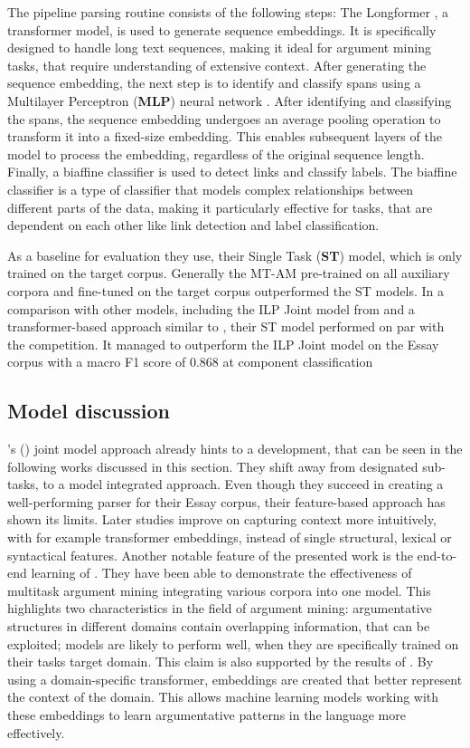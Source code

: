The pipeline parsing routine consists of the following steps: The Longformer \parencite{beltagy2020longformer}, a transformer model, is used to generate sequence embeddings. It is specifically designed to handle long text sequences, making it ideal for argument mining tasks, that require understanding of extensive context. After generating the sequence embedding, the next step is to identify and classify spans using a Multilayer Perceptron (\textbf{MLP}) neural network \parencite{nn_foundation}. After identifying and classifying the spans, the sequence embedding undergoes an average pooling operation to transform it into a fixed-size embedding. This enables subsequent layers of the model to process the embedding, regardless of the original sequence length. Finally, a biaffine classifier is used to detect links and classify labels. The biaffine classifier is a type of classifier that models complex relationships between different parts of the data, making it particularly effective for tasks, that are dependent on each other like link detection and label classification. 

As a baseline for evaluation they use, their Single Task (\textbf{ST}) model, which is only trained on the target corpus. Generally the MT-AM pre-trained on all auxiliary corpora and fine-tuned on the target corpus outperformed the ST models. In a comparison with other models, including the ILP Joint model from \textcite{ParsingArgumentationStructures} and a transformer-based approach similar to \textcite{TransformerHealthcareAM}, their ST model performed on par with the competition. It managed to outperform the ILP Joint model on the Essay corpus with a macro F1 score of 0.868 at component classification \parencite{mtc} 

\subsection{Model discussion}
\citeauthor{ParsingArgumentationStructures}'s (\citeyear{ParsingArgumentationStructures}) joint model approach already hints to a development, that can be seen in the following works discussed in this section. They shift away from designated sub-tasks, to a model integrated approach. Even though they succeed in creating a well-performing parser for their Essay corpus, their feature-based approach has shown its limits. Later studies improve on capturing context more intuitively, with for example transformer embeddings, instead of single structural, lexical or syntactical features.  Another notable feature of the presented work is the end-to-end learning of \textcite{EndToEndAM}. They have been able to demonstrate the effectiveness of multitask argument mining integrating various corpora into one model. This highlights two characteristics in the field of argument mining: argumentative structures in different domains contain overlapping information, that can be exploited; models are likely to perform well, when they are specifically trained on their tasks target domain. This claim is also supported by the results of \textcite{TransformerHealthcareAM}. By using a domain-specific transformer, embeddings are created that better represent the context of the domain. This allows machine learning models working with these embeddings to learn argumentative patterns in the language more effectively.